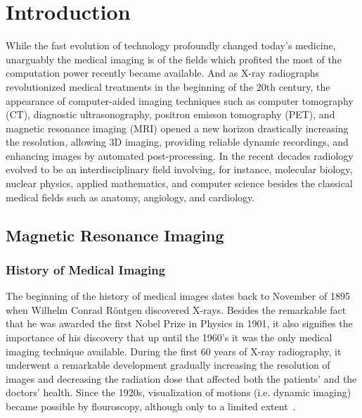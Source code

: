 \chapter{Introduction}

While the fast evolution of technology profoundly changed today's medicine, unarguably the medical imaging is of the fields which profited the most of the computation power recently became available. And as X-ray radiographs revolutionized medical treatments in the beginning of the 20th century,  the appearance of computer-aided imaging techniques such as computer tomography (CT), diagnostic ultrasonography, positron emisson tomography (PET), and magnetic resonance imaging (MRI) opened a new horizon drastically increasing the resolution, allowing 3D imaging, providing reliable dynamic recordings, and enhancing images by automated post-processing. In the recent decades radiology evolved to be an interdisciplinary field involving, for instance, molecular biology, nuclear physics, applied mathematics, and computer science besides the classical medical fields such as anatomy, angiology, and cardiology.

\section{Magnetic Resonance Imaging}

\subsection{History of Medical Imaging}
The beginning of the history of medical images dates back to November of 1895 when Wilhelm Conrad Röntgen discovered X-rays. Besides the remarkable fact that he was awarded the first Nobel Prize in Physics in 1901, it also signifies the importance of his discovery that up until the 1960's it was the only medical imaging technique available. During the first 60 years of X-ray radiography, it underwent a remarkable development gradually increasing the resolution of images and decreasing the radiation dose that affected both the patients' and the doctors' health. Since the 1920s, visualization of motions (i.e. dynamic imaging) became possible by flouroscopy, although only to a limited extent~\cite{bradley_history_2008}.

